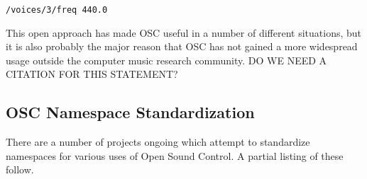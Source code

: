 \documentclass{sig-alternate}
\begin{document}
\texttt{/voices/3/freq 440.0}

This open approach has made OSC useful in a number of different situations, but it is also probably the major reason that OSC has not gained a more widespread usage outside the computer music research community.  DO WE NEED A CITATION FOR THIS STATEMENT? 


\subsection{OSC Namespace Standardization}

There are a number of projects ongoing which attempt to standardize namespaces for various uses of Open Sound Control. A partial listing of these follow.

\begin{itemize}


\end{itemize}
\end{document}
